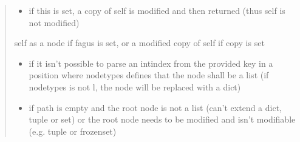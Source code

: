 \documentclass[a4paper,10pt,english]{sphinxmanual}
\begin{document}
\begin{fulllineitems}
\begin{fulllineitems}
\begin{quote}
\begin{description}
\begin{itemize}
\item {}
\sphinxAtStartPar
{} \textendash{} if this is set, a copy of self is modified and then returned (thus self is not modified)

\end{itemize}

\sphinxAtStartPar
self as a node if fagus is set, or a modified copy of self if copy is set

\begin{itemize}
\item {}
\sphinxAtStartPar
{} \textendash{} if it isn’t possible to parse an int\sphinxhyphen{}index from the provided key in a position where node\sphinxhyphen{}types
    defines that the node shall be a list (if node\sphinxhyphen{}types is not l, the node will be replaced with a dict)

\item {}
\sphinxAtStartPar
{} \textendash{} if path is empty and the root node is not a list (can’t extend a dict, tuple or set) or the
    root node needs to be modified and isn’t modifiable (e.g. tuple or frozenset)

\end{itemize}

\end{description}\end{quote}

\end{fulllineitems}



\end{fulllineitems}
\end{document}
